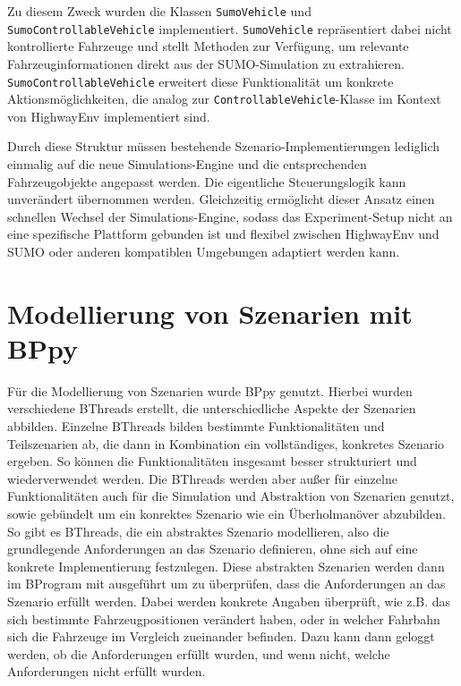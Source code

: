 Zu diesem Zweck wurden die Klassen \texttt{SumoVehicle} und \texttt{SumoControllableVehicle} implementiert. \texttt{SumoVehicle} repräsentiert dabei nicht kontrollierte Fahrzeuge und stellt Methoden zur Verfügung, um relevante Fahrzeuginformationen direkt aus der SUMO-Simulation zu extrahieren. \texttt{SumoControllableVehicle} erweitert diese Funktionalität um konkrete Aktionsmöglichkeiten, die analog zur \texttt{ControllableVehicle}-Klasse im Kontext von HighwayEnv implementiert sind.

Durch diese Struktur müssen bestehende Szenario-Implementierungen lediglich einmalig auf die neue Simulations-Engine und die entsprechenden Fahrzeugobjekte angepasst werden. Die eigentliche Steuerungslogik kann unverändert übernommen werden. Gleichzeitig ermöglicht dieser Ansatz einen schnellen Wechsel der Simulations-Engine, sodass das Experiment-Setup nicht an eine spezifische Plattform gebunden ist und flexibel zwischen HighwayEnv und SUMO oder anderen kompatiblen Umgebungen adaptiert werden kann.

\section{Modellierung von Szenarien mit BPpy}
Für die Modellierung von Szenarien wurde BPpy genutzt. Hierbei wurden verschiedene BThreads erstellt, die unterschiedliche Aspekte der Szenarien abbilden.
Einzelne BThreads bilden bestimmte Funktionalitäten und Teilszenarien ab, die dann in Kombination ein vollständiges, konkretes Szenario ergeben. So können die Funktionalitäten insgesamt besser strukturiert und wiederverwendet werden.
Die BThreads werden aber außer für einzelne Funktionalitäten auch für die Simulation und Abstraktion von Szenarien genutzt, sowie gebündelt um ein konrektes Szenario wie ein Überholmanöver abzubilden.
So gibt es BThreads, die ein abstraktes Szenario modellieren, also die grundlegende Anforderungen an das Szenario definieren, ohne sich auf eine konkrete Implementierung festzulegen. Diese abstrakten Szenarien werden dann im BProgram mit ausgeführt um zu überprüfen, dass die Anforderungen an das Szenario erfüllt werden.
Dabei werden konkrete Angaben überprüft, wie z.B. das sich bestimmte Fahrzeugpositionen verändert haben, oder in welcher Fahrbahn sich die Fahrzeuge im Vergleich zueinander befinden.
Dazu kann dann geloggt werden, ob die Anforderungen erfüllt wurden, und wenn nicht, welche Anforderungen nicht erfüllt wurden.

